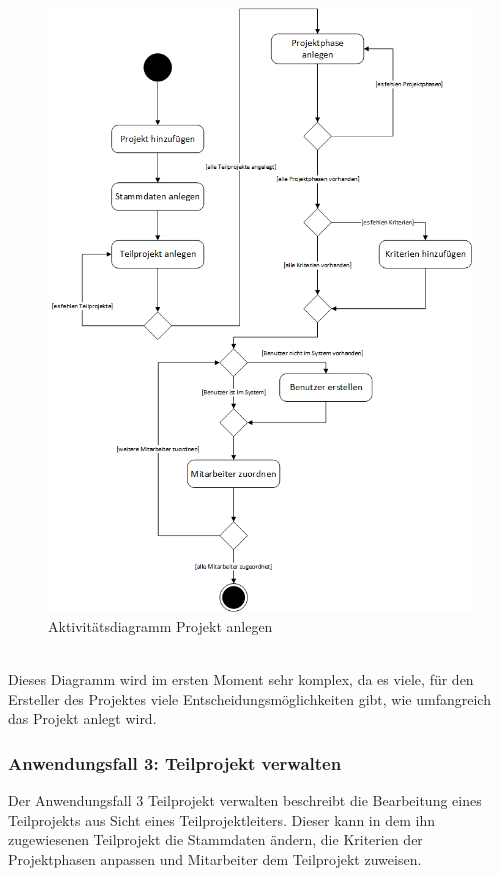 \begin{figure}[h!]
    \centering
    \includegraphics[scale=0.67]{./Bilder/AD2_ProjektAnlegen.png}
    \caption[Aktivitätsdiagramm Anwendungsfall 2]{Aktivitätsdiagramm Projekt anlegen}
    \label{fig:AD2}
\end{figure}
\\Dieses Diagramm wird im ersten Moment sehr komplex, da es viele, für den Ersteller des Projektes viele Entscheidungsmöglichkeiten gibt, wie umfangreich das Projekt anlegt wird. 

\newpage
\subsubsection{Anwendungsfall 3: Teilprojekt verwalten}
Der Anwendungsfall 3 \glqq{}Teilprojekt verwalten\grqq{} beschreibt die Bearbeitung eines Teilprojekts aus Sicht eines Teilprojektleiters. Dieser kann in dem ihn zugewiesenen Teilprojekt die Stammdaten ändern, die Kriterien der Projektphasen anpassen und Mitarbeiter dem Teilprojekt zuweisen.\\

